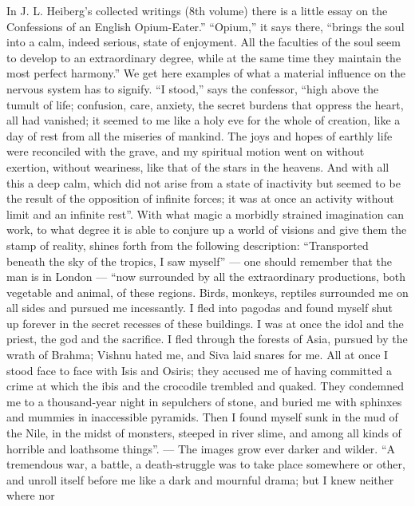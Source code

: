 \documentclass[12pt,a4paper,openany]{book}
\newcommand{\opage}[1]{\marginnote{\footnotesize\textit{[#1]}}}
\begin{document}
In J. L. Heiberg's collected writings (8th volume) there is a little essay on the Confessions of an English Opium-Eater.'' ``Opium,'' it says there, ``brings the soul into a calm, indeed serious, state of enjoyment. All the faculties of the soul seem to develop to an extraordinary degree, while at the same time they maintain the most perfect harmony.'' We get here examples of what a material influence on the nervous system has to signify. ``I stood,'' says the confessor, ``high above the tumult of life; confusion, care, anxiety, the secret burdens that oppress the heart, all had vanished; it seemed to me like a holy eve for the whole of creation, like a day of rest from all the miseries of mankind. The joys and hopes of earthly life were reconciled with the grave, and my spiritual motion went on without
\setcounter{footnote}{0}%
\opage{81}exertion, without weariness, like that of the stars in the heavens. And with all this a deep calm, which did not arise from a state of inactivity but seemed to be the result of the opposition of infinite forces; it was at once an activity without limit and an infinite rest''. With what magic a morbidly strained imagination can work, to what degree it is able to conjure up a world of visions and give them the stamp of reality, shines forth from the following description: ``Transported beneath the sky of the tropics, I saw myself'' --- one should remember that the man is in London --- ``now surrounded by all the extraordinary productions, both vegetable and animal, of these regions. Birds, monkeys, reptiles surrounded me on all sides and pursued me incessantly. I fled into pagodas and found myself shut up forever in the secret recesses of these buildings. I was at once the idol and the priest, the god and the sacrifice. I fled through the forests of Asia, pursued by the wrath of Brahma; Vishnu hated me, and Siva laid snares for me. All at once I stood face to face with Isis and Osiris; they accused me of having committed a crime at which the ibis and the crocodile trembled and quaked. They condemned me to a thousand-year night in sepulchers of stone, and buried me with sphinxes and mummies in inaccessible pyramids. Then I found myself sunk in the mud of the Nile, in the midst of monsters, steeped in river slime, and among all kinds of horrible and loathsome things''. --- The images grow ever darker and wilder. ``A tremendous war, a battle, a death-struggle was to take place somewhere or other, and unroll itself before me like a dark and mournful drama; but I knew neither where nor
\setcounter{footnote}{0}%
\end{document}
